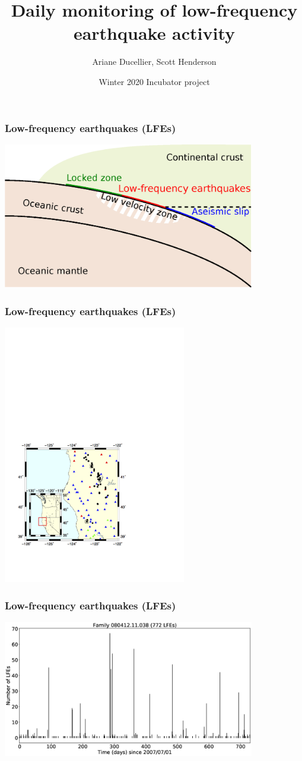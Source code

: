 \documentclass{beamer}
\title[Daily monitoring of low-frequency earthquake activity]{Daily monitoring of low-frequency earthquake activity}
\author{Ariane Ducellier, Scott Henderson}
\date{Winter 2020 Incubator project}
\begin{document}
	\begin{frame}
		\titlepage
	\end{frame}

	\begin{frame}
		\frametitle{Low-frequency earthquakes (LFEs)}
		\includegraphics[width=11cm]{LFE_location.eps}
	\end{frame}

	\begin{frame}
		\frametitle{Low-frequency earthquakes (LFEs)}
		\centering
		\includegraphics[width=8cm, trim=1cm 4cm 6cm 13cm, clip]{map.png}
	\end{frame}

	\begin{frame}
		\frametitle{Low-frequency earthquakes (LFEs)}
		\includegraphics[width=11cm]{catalog_2007_2009.eps}
	\end{frame}
\end{document}
